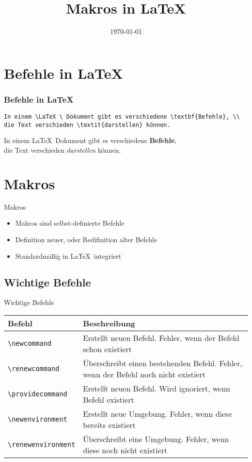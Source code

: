 \documentclass[10pt,a4paper, ngerman]{beamer}
\title{Makros in \LaTeX}
\date{\today}
\institute[HBBK]{Hans-Böckler-Berufskolleg}
\begin{document}
\begin{frame}
\titlepage
\end{frame}

\section{Befehle in \LaTeX}

\begin{frame}[fragile]
\frametitle{Befehle in \LaTeX}
\begin{lstlisting}[caption = Befehle]
In einem \LaTeX \ Dokument gibt es verschiedene \textbf{Befehle}, \\
die Text verschieden \textit{darstellen} können.
\end{lstlisting} 
\begin{hlbox}
In einem \LaTeX \ Dokument gibt es verschiedene \textbf{Befehle}, \\
die Text verschieden \textit{darstellen} können.
\end{hlbox}
\end{frame}


\section{Makros}
\begin{frame}{Makros}
\begin{itemize} 
\item Makros sind selbst-definierte Befehle
\pause
\item Definition neuer, oder Redifinition alter Befehle
\pause
\item Standardmäßig in \LaTeX \ integriert
\end{itemize}
\end{frame}

\subsection{Wichtige Befehle}

\begin{frame}[fragile]{Wichtige Befehle}
\begin{tabular}{l|p{}}
\textbf{Befehl} & \textbf{Beschreibung} \\ \hline
\lstinline|\newcommand| & Erstellt neuen Befehl. Fehler, wenn der Befehl schon existiert \\ \pause
\lstinline|\renewcommand| & Überschreibt einen bestehenden Befehl. Fehler, wenn der Befehl noch nicht existiert \\ \pause
\lstinline|\providecommand| & Erstellt neuen Befehl. Wird ignoriert, wenn Befehl existiert \\ \pause
\lstinline|\newenvironment| & Erstellt neue Umgebung. Fehler, wenn diese bereits existiert  \\ \pause
\lstinline|\renewenvironment|  & Überschreibt eine Umgebung. Fehler, wenn diese noch nicht existiert \\
\end{tabular}
\end{frame}
\end{document}
